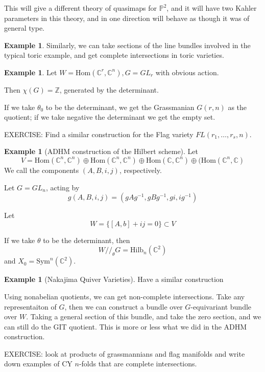 \documentclass{amsart}
\theoremstyle{definition}
\newtheorem{example}[dummy]{Example}
\newcommand{\Z}{\mathbb{Z}}
\newcommand{\GIT}{//}
\newcommand{\proj}{\mathbb{P}}
\newcommand{\C}{\mathbb{C}}
\newcommand{\Hom}{\text{Hom}}
\begin{document}
This will give a different theory of quasimaps for $\proj^2$, and it will have two Kahler parameters in this theory, and in one direction will behave as though it was of general type.

\begin{example}
Similarly, we can take sections of the line bundles involved in the typical toric example, and get complete intersections in toric varieties.
\end{example}



\begin{example}
Let $W=\Hom(\C^r,\C^n), G=GL_r$ with obvious action.

Then $\chi(G)=\Z$, generated by the determinant.

If we take $\theta_0$ to be the determinant, we get the Grassmanian $G(r,n)$ as the quotient; if we take negative the determinant we get the empty set.
\end{example}

EXERCISE: Find a similar construction for the Flag variety $FL(r_1,\dots, r_s,n)$.

\begin{example}[ADHM construction of the Hilbert scheme]

Let $$V=\Hom(\C^n, \C^n)\oplus\Hom(\C^n, \C^n)\oplus \Hom(\C, \C^n)\oplus (\Hom(\C^n,\C)$$
We call the components $(A,B,i,j)$, respectively.

Let $G=GL_n$, acting by
$$g(A,B,i,j)=(gAg^{-1}, gBg^{-1}, gi, ig^{-1})$$

Let $$W=\{[A,b]+ij=0\}\subset V$$

If we take $\theta$ to be the determinant, then 
$$W\GIT_\theta G=\text{Hilb}_n(\C^2)$$
and $X_0=\text{Sym}^n(\C^2)$.
\end{example}

\begin{example}[Nakajima Quiver Varieties]
Have a similar construction
\end{example}


Using nonabelian quotients, we can get non-complete intersections.  Take any representaiton of $G$, then we can construct a bundle over $G$-equivariant bundle over $W$.  Taking a general section of this bundle, and take the zero section, and we can still do the GIT quotient.  This is more or less what we did in the ADHM construction.

EXERCISE: look at products of grassmannians and flag manifolds and write down examples of CY $n$-folds that are complete intersections.
\end{document}
